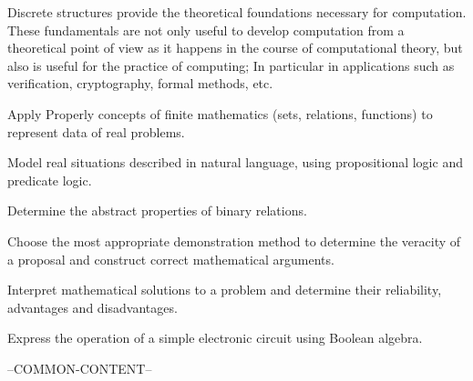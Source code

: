 \begin{syllabus}


\begin{justification}

Discrete structures provide the theoretical foundations necessary for computation. These fundamentals are not only useful to develop computation from a theoretical point of view as it happens 
in the course of computational theory, but also is useful for the practice of computing; In particular in applications such as verification,
cryptography, formal methods, etc.

\end{justification}

\begin{goals}
\item Apply Properly concepts of finite mathematics (sets, relations, functions) to represent data of real problems.
\item Model real situations described in natural language, using propositional logic and predicate logic.
\item Determine the abstract properties of binary relations.
\item Choose the most appropriate demonstration method to determine the veracity of a proposal and construct correct mathematical arguments.
\item Interpret mathematical solutions to a problem and determine their reliability, advantages and disadvantages.
\item Express the operation of a simple electronic circuit using Boolean algebra.
\end{goals}

--COMMON-CONTENT--


\end{syllabus}
